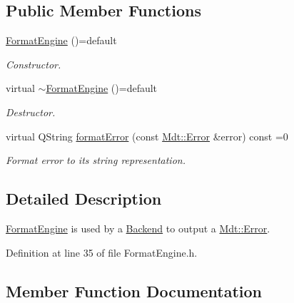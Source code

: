\subsection*{Public Member Functions}
\begin{DoxyCompactItemize}
\item 
\hyperlink{class_mdt_1_1_error_logger_1_1_format_engine_a8a2fb5de4c00859bb221020706d3f471}{Format\+Engine} ()=default\hypertarget{class_mdt_1_1_error_logger_1_1_format_engine_a8a2fb5de4c00859bb221020706d3f471}{}\label{class_mdt_1_1_error_logger_1_1_format_engine_a8a2fb5de4c00859bb221020706d3f471}

\begin{DoxyCompactList}\small\item\em Constructor. \end{DoxyCompactList}\item 
virtual \hyperlink{class_mdt_1_1_error_logger_1_1_format_engine_aedea7a2d86d0e80595f5aa72ea34cfc1}{$\sim$\+Format\+Engine} ()=default\hypertarget{class_mdt_1_1_error_logger_1_1_format_engine_aedea7a2d86d0e80595f5aa72ea34cfc1}{}\label{class_mdt_1_1_error_logger_1_1_format_engine_aedea7a2d86d0e80595f5aa72ea34cfc1}

\begin{DoxyCompactList}\small\item\em Destructor. \end{DoxyCompactList}\item 
virtual Q\+String \hyperlink{class_mdt_1_1_error_logger_1_1_format_engine_a7fba83de818d69bf7b6e9cf74cf0200e}{format\+Error} (const \hyperlink{class_mdt_1_1_error}{Mdt\+::\+Error} \&error) const =0
\begin{DoxyCompactList}\small\item\em Format {\itshape error} to its string representation. \end{DoxyCompactList}\end{DoxyCompactItemize}


\subsection{Detailed Description}
\hyperlink{class_mdt_1_1_error_logger_1_1_format_engine}{Format\+Engine} is used by a \hyperlink{class_mdt_1_1_error_logger_1_1_backend}{Backend} to output a \hyperlink{class_mdt_1_1_error}{Mdt\+::\+Error}. 

Definition at line 35 of file Format\+Engine.\+h.



\subsection{Member Function Documentation}
